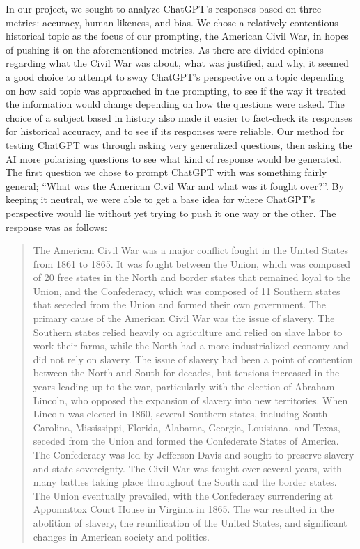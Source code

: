 \documentclass[letterpaper, 10pt, conference]{ieeeconf}
\begin{document}
    In our project, we sought to analyze ChatGPT’s responses based on three metrics: accuracy, human-likeness, and bias. We chose a
    relatively contentious historical topic as the focus of our prompting, the American Civil War, in hopes of pushing it on the
    aforementioned metrics. As there are divided opinions regarding what the Civil War was about, what was justified, and why, it
    seemed a good choice to attempt to sway ChatGPT’s perspective on a topic depending on how said topic was approached in the
    prompting, to see if the way it treated the information would change depending on how the questions were asked. The choice of a
    subject based in history also made it easier to fact-check its responses for historical accuracy, and to see if its responses were
    reliable.
    Our method for testing ChatGPT was through asking very generalized questions, then asking the AI more polarizing questions to
    see what kind of response would be generated. The first question we chose to prompt ChatGPT with was something fairly general;
    “What was the American Civil War and what was it fought over?”. By keeping it neutral, we were able to get a base idea for where
    ChatGPT’s perspective would lie without yet trying to push it one way or the other. The response was as follows:
    \begin{quote}
    The American Civil War was a major conflict fought in the United States from 1861 to 1865. It was
    fought between the Union, which was composed of 20 free states in the North and border states
    that remained loyal to the Union, and the Confederacy, which was composed of 11 Southern states
    that seceded from the Union and formed their own government.
    The primary cause of the American Civil War was the issue of slavery. The Southern states relied
    heavily on agriculture and relied on slave labor to work their farms, while the North had a more
    industrialized economy and did not rely on slavery. The issue of slavery had been a point of
    contention between the North and South for decades, but tensions increased in the years leading up
    to the war, particularly with the election of Abraham Lincoln, who opposed the expansion of slavery
    into new territories.
    When Lincoln was elected in 1860, several Southern states, including South Carolina, Mississippi,
    Florida, Alabama, Georgia, Louisiana, and Texas, seceded from the Union and formed the
    Confederate States of America. The Confederacy was led by Jefferson Davis and sought to preserve
    slavery and state sovereignty.
    The Civil War was fought over several years, with many battles taking place throughout the South
    and the border states. The Union eventually prevailed, with the Confederacy surrendering at
    Appomattox Court House in Virginia in 1865. The war resulted in the abolition of slavery, the
    reunification of the United States, and significant changes in American society and politics.
    \end{quote}
\end{document}
